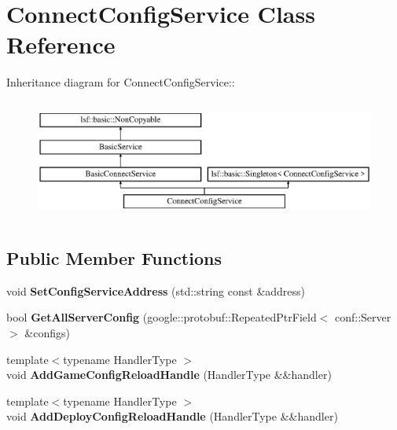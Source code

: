 \hypertarget{classConnectConfigService}{
\section{ConnectConfigService Class Reference}
\label{classConnectConfigService}
}
Inheritance diagram for ConnectConfigService::\begin{figure}[H]
\begin{center}
\leavevmode
\includegraphics[height=4cm]{classConnectConfigService}
\end{center}
\end{figure}
\subsection*{Public Member Functions}
\begin{DoxyCompactItemize}
\item 
\hypertarget{classConnectConfigService_a1a9bb65afb9769d1716aca8555d191ef}{
void {\bfseries SetConfigServiceAddress} (std::string const \&address)}
\label{classConnectConfigService_a1a9bb65afb9769d1716aca8555d191ef}

\item 
\hypertarget{classConnectConfigService_a9b85ea23b35cd11d791e430304a94a5c}{
bool {\bfseries GetAllServerConfig} (google::protobuf::RepeatedPtrField$<$ conf::Server $>$ \&configs)}
\label{classConnectConfigService_a9b85ea23b35cd11d791e430304a94a5c}

\item 
\hypertarget{classConnectConfigService_a2124dc07fe28c26d3acdde966b2b63a6}{
{\footnotesize template$<$typename HandlerType $>$ }\\void {\bfseries AddGameConfigReloadHandle} (HandlerType \&\&handler)}
\label{classConnectConfigService_a2124dc07fe28c26d3acdde966b2b63a6}

\item 
\hypertarget{classConnectConfigService_a43377ea1fa35ae38f81836701d17bd42}{
{\footnotesize template$<$typename HandlerType $>$ }\\void {\bfseries AddDeployConfigReloadHandle} (HandlerType \&\&handler)}
\label{classConnectConfigService_a43377ea1fa35ae38f81836701d17bd42}

\end{DoxyCompactItemize}
